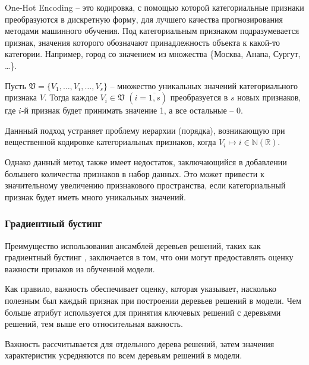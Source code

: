 \documentclass[12pt]{article}
\begin{document}
    \par One-Hot Encoding -- это кодировка, с помощью которой категориальные признаки преобразуются в дискретную форму, для лучшего качества прогнозирования методами машинного обучения. Под категориальным признаком подразумевается признак, значения которого обозначают принадлежность объекта к какой-то категории. Например, город со значением из множества \{Москва, Анапа, Сургут, \ldots\}.

    \par Пусть $ \mathfrak{V} = \{V_1, \ldots, V_i, \ldots, V_s\} $ -- множество уникальных значений категориального признака $V$. Тогда каждое $V_i \in \mathfrak{V}$ $(i = \overline{1,s})$ преобразуется в $s$ новых признаков, где $i$-й признак будет принимать значение 1, а все остальные -- 0.

    \par Даннный подход устраняет проблему иерархии (порядка), возникающую при вещественной кодировке категориальных признаков, когда $V_i \mapsto i \in \mathbb{N}(\mathbb{R})$.

    \par Однако данный метод также имеет недостаток, заключающийся в добавлении большего количества признаков в набор данных. Это может привести к значительному увеличению признакового пространства, если категориальный признак будет иметь много уникальных значений.




    \subsubsection{Градиентный бустинг}
    \label{sec:Research:FeatureSpace:GradientBoostingClassifier}

    \par Преимущество использования ансамблей деревьев решений, таких как градиентный бустинг \cite{GBM}, заключается в том, что они могут предоставлять оценку важности призаков из обученной модели.

    \par Как правило, важность обеспечивает оценку, которая указывает, насколько полезным был каждый признак при построении деревьев решений в модели. Чем больше атрибут используется для принятия ключевых решений с деревьями решений, тем выше его относительная важность.

    \par Важность рассчитывается для отдельного дерева решений, затем значения характеристик усредняются по всем деревьям решений в модели.
\end{document}

